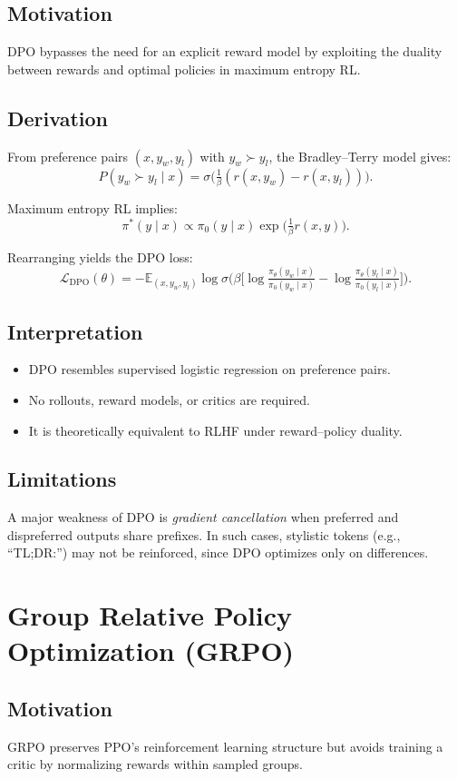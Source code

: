 \subsection{Motivation}
DPO bypasses the need for an explicit reward model by exploiting the duality between rewards and optimal policies in maximum entropy RL.

\subsection{Derivation}
From preference pairs $(x,y_w,y_l)$ with $y_w \succ y_l$, the Bradley–Terry model gives:
\[
P(y_w \succ y_l \mid x) = \sigma\!\Big(\tfrac{1}{\beta}(r(x,y_w)-r(x,y_l))\Big).
\]

Maximum entropy RL implies:
\[
\pi^*(y \mid x) \propto \pi_0(y \mid x) \exp\!\Big(\tfrac{1}{\beta} r(x,y)\Big).
\]

Rearranging yields the DPO loss:
\[
\mathcal{L}_{\text{DPO}}(\theta) = - \mathbb{E}_{(x,y_w,y_l)} \log \sigma\!\Big(\beta\big[
\log \tfrac{\pi_\theta(y_w \mid x)}{\pi_0(y_w \mid x)} 
- \log \tfrac{\pi_\theta(y_l \mid x)}{\pi_0(y_l \mid x)} \big]\Big).
\]

\subsection{Interpretation}
\begin{itemize}
    \item DPO resembles supervised logistic regression on preference pairs.
    \item No rollouts, reward models, or critics are required.
    \item It is theoretically equivalent to RLHF under reward–policy duality.
\end{itemize}

\subsection{Limitations}
A major weakness of DPO is \emph{gradient cancellation} when preferred and dispreferred outputs share prefixes. In such cases, stylistic tokens (e.g., ``TL;DR:'') may not be reinforced, since DPO optimizes only on differences.

\section{Group Relative Policy Optimization (GRPO)}

\subsection{Motivation}
GRPO preserves PPO’s reinforcement learning structure but avoids training a critic by normalizing rewards within sampled groups.


